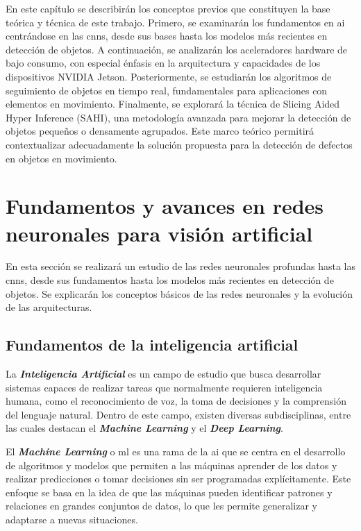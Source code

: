 \documentclass[11pt,spanish,listoffigures,listoftables]{tfgetsinf}
\begin{document}
En este capítulo se describirán los conceptos previos que constituyen la base teórica y técnica de este trabajo. Primero, se examinarán los fundamentos en \gls{ai} centrándose en las \glspl{cnn}, desde sus bases hasta los modelos más recientes en detección de objetos. A continuación, se analizarán los aceleradores hardware de bajo consumo, con especial énfasis en la arquitectura y capacidades de los dispositivos NVIDIA Jetson. Posteriormente, se estudiarán los algoritmos de seguimiento de objetos en tiempo real, fundamentales para aplicaciones con elementos en movimiento. Finalmente, se explorará la técnica de Slicing Aided Hyper Inference (SAHI), una metodología avanzada para mejorar la detección de objetos pequeños o densamente agrupados. Este marco teórico permitirá contextualizar adecuadamente la solución propuesta para la detección de defectos en objetos en movimiento.

\section{Fundamentos y avances en redes neuronales para visión artificial} \label{sec:fundamentos_avances}
En esta sección se realizará un estudio de las redes neuronales profundas hasta las \glspl{cnn}, desde sus fundamentos hasta los modelos más recientes en detección de objetos. Se explicarán los conceptos básicos de las redes neuronales y la evolución de las arquitecturas.

\subsection{Fundamentos de la inteligencia artificial} \label{sec:fundamentos_inteligencia_artificial}
La \textit{\textbf{Inteligencia Artificial}} es un campo de estudio que busca desarrollar sistemas capaces de realizar tareas que normalmente requieren inteligencia humana, como el reconocimiento de voz, la toma de decisiones y la comprensión del lenguaje natural. Dentro de este campo, existen diversas 
subdisciplinas, entre las cuales destacan el \textit{\textbf{Machine Learning}} y el \textit{\textbf{Deep Learning}}.

El \textit{\textbf{Machine Learning}} o \gls{ml} es una rama de la \gls{ai} que se centra en el desarrollo de algoritmos y modelos que permiten a las máquinas aprender de los datos y realizar predicciones o tomar decisiones sin ser programadas explícitamente. Este enfoque se basa en la idea de que las máquinas pueden identificar patrones y relaciones en grandes conjuntos de datos, lo que les permite generalizar y adaptarse a nuevas situaciones.
\end{document}

